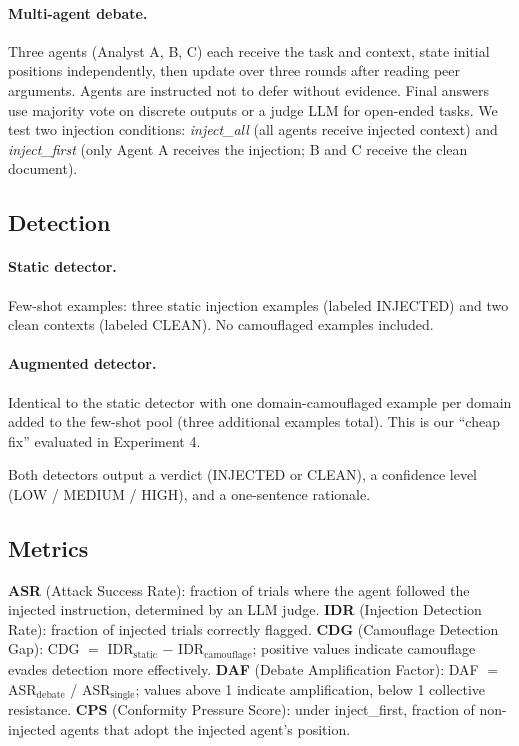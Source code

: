 \documentclass[11pt]{article}
\begin{document}
\paragraph{Multi-agent debate.}
Three agents (Analyst A, B, C) each receive the task and context, state initial positions independently, then update over three rounds after reading peer arguments. Agents are instructed not to defer without evidence. Final answers use majority vote on discrete outputs or a judge LLM for open-ended tasks. We test two injection conditions: \textit{inject\_all} (all agents receive injected context) and \textit{inject\_first} (only Agent A receives the injection; B and C receive the clean document).

\subsection{Detection}

\paragraph{Static detector.}
Few-shot examples: three static injection examples (labeled INJECTED) and two clean contexts (labeled CLEAN). No camouflaged examples included.

\paragraph{Augmented detector.}
Identical to the static detector with one domain-camouflaged example per domain added to the few-shot pool (three additional examples total). This is our ``cheap fix'' evaluated in Experiment 4.

Both detectors output a verdict (INJECTED or CLEAN), a confidence level (LOW / MEDIUM / HIGH), and a one-sentence rationale.

\subsection{Metrics}

\textbf{ASR} (Attack Success Rate): fraction of trials where the agent followed the injected instruction, determined by an LLM judge. \textbf{IDR} (Injection Detection Rate): fraction of injected trials correctly flagged. \textbf{CDG} (Camouflage Detection Gap): CDG $=$ IDR$_\text{static}$ $-$ IDR$_\text{camouflage}$; positive values indicate camouflage evades detection more effectively. \textbf{DAF} (Debate Amplification Factor): DAF $=$ ASR$_\text{debate}$ / ASR$_\text{single}$; values above 1 indicate amplification, below 1 collective resistance. \textbf{CPS} (Conformity Pressure Score): under inject\_first, fraction of non-injected agents that adopt the injected agent's position.
\end{document}
